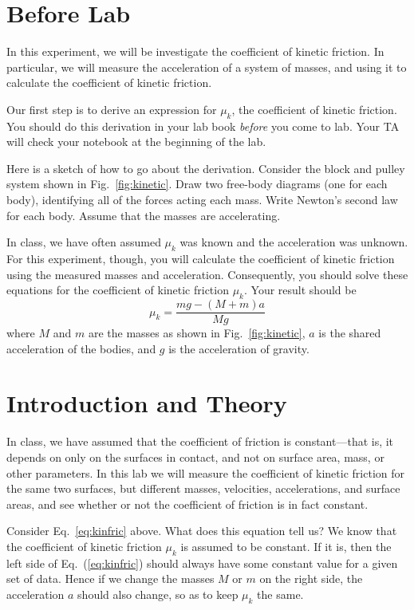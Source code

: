 \newexp \label{exp:kinetic}
  

\section*{Before Lab} In this experiment, we will be investigate the
coefficient of kinetic friction.  In particular, we will measure
the acceleration of a system of masses, and using it to calculate the
coefficient of kinetic friction.

Our first step is to derive an expression for $\mu_k$, the
coefficient
of kinetic friction.  You should do this derivation in your lab book
{\em before} you come to lab.  Your TA will check your notebook at
the beginning of the lab.

Here is a sketch of how to go about the derivation.  Consider the block
and pulley system shown in Fig.~\ref{fig:kinetic}.  Draw two
free-body
diagrams (one for each body), identifying all of the forces acting each mass.  Write
Newton's second law for each body.   Assume that the masses are
accelerating.

In class, we have often assumed $\mu_k$ was known and the acceleration
was unknown.
For this experiment, though, you will calculate the
coefficient of kinetic friction using the measured masses and
acceleration.  Consequently, you should solve these equations for the
coefficient of kinetic friction $\mu_k$.  Your
result should be
\setcounter{equation}{0}
\begin{equation}
	\mu_{k} = \frac{mg - (M+m)a}{Mg} \label{eq:kinfric}
\end{equation}
where $M$ and $m$ are the masses as shown in Fig.~\ref{fig:kinetic},
$a$ is the shared acceleration of the bodies, and $g$ is the acceleration
of gravity.

\section*{Introduction and Theory}
In class, we have assumed that the
coefficient of friction is constant---that is, it depends on only on the surfaces
in contact, and not on surface area, mass, or other parameters.  In
this lab we will measure the
coefficient of kinetic friction for the same two surfaces, but different
masses, velocities, accelerations, and surface areas, and see whether
or not the coefficient of friction is in fact constant.

Consider Eq.~\ref{eq:kinfric} above.  What does this equation tell us?
We know that the
coefficient of kinetic friction $\mu_{k}$ is assumed to be constant.
If it is, then the left side of Eq.~(\ref{eq:kinfric})
should always have some constant value for a given set of data.  Hence
if
we change the masses $M$ or $m$ on the right side, the acceleration
$a$ should also change, so as to keep $\mu_k$
 the same.

